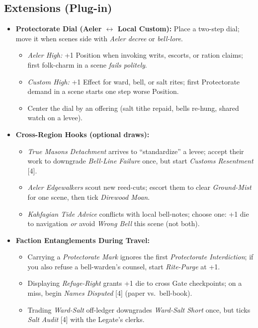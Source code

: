 \subsection*{Extensions (Plug-in)}
\label{sec:mistlands-extensions}
\begin{itemize}
  \item \textbf{Protectorate Dial (Aeler \(\leftrightarrow\) Local Custom):} Place a two-step dial; move it when scenes side with \emph{Aeler decree} or \emph{bell-lore}.
  \begin{itemize}
    \item \emph{Aeler High:} +1 Position when invoking writs, escorts, or ration claims; first folk-charm in a scene \emph{fails politely}.
    \item \emph{Custom High:} +1 Effect for ward, bell, or salt rites; first Protectorate demand in a scene starts one step worse Position.
    \item Center the dial by an offering (salt tithe repaid, bells re-hung, shared watch on a levee).
  \end{itemize}

  \item \textbf{Cross-Region Hooks (optional draws):}
  \begin{itemize}
    \item \emph{True Masons Detachment} arrives to “standardize” a levee; accept their work to downgrade \emph{Bell-Line Failure} once, but start \emph{Customs Resentment} [4].
    \item \emph{Aeler Edgewalkers} scout new reed-cuts; escort them to clear \emph{Ground-Mist} for one scene, then tick \emph{Direwood Moan}.
    \item \emph{Kahfagian Tide Advice} conflicts with local bell-notes; choose one: +1 die to navigation \emph{or} avoid \emph{Wrong Bell} this scene (not both).
  \end{itemize}

  \item \textbf{Faction Entanglements During Travel:}
  \begin{itemize}
    \item Carrying a \emph{Protectorate Mark} ignores the first \emph{Protectorate Interdiction}; if you also refuse a bell-warden’s counsel, start \emph{Rite-Purge} at +1.
    \item Displaying \emph{Refuge-Right} grants +1 die to cross Gate checkpoints; on a miss, begin \emph{Names Disputed} [4] (paper vs.\ bell-book).
    \item Trading \emph{Ward-Salt} off-ledger downgrades \emph{Ward-Salt Short} once, but ticks \emph{Salt Audit} [4] with the Legate’s clerks.
  \end{itemize}


\end{itemize}

